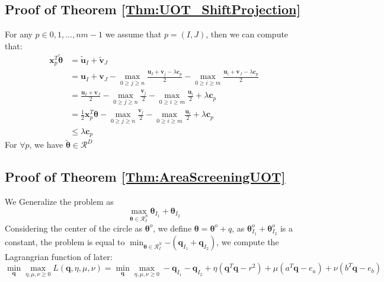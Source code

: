 \documentclass[twoside]{article}
\theoremstyle{plain}
\newcommand{\tranT}{T}
\renewcommand{\vec}[1]{\bm{#1}}
\begin{document}
\subsection{Proof of Theorem \ref{Thm:UOT_ShiftProjection}}
For any $p \in {0,1,...,nm -1}$ we assume that $p = (I,J)$, then we can compute that:
 \begin{equation}
\begin{split} 
\vec{x}_p^{\tranT}\tilde{\vec{\theta}} &= \tilde{\vec{u}}_{I} + \tilde{\vec{v}}_J \\
				    &= {\vec{u}}_{I} + {\vec{v}}_J - \max_{0\geq j\geq n} \frac{{\vec{u}}_I +{\vec{v}}_j - \lambda \vec{c}_{p}}{2} - \max_{0 \geq i \geq m} \frac{{\vec{u}}_i +{\vec{v}}_J - \lambda \vec{c}_{p}}{2}\\
				    &= \frac{{\vec{u}}_{I} + {\vec{v}}_J}{2} - \max_{0\geq j\geq n} \frac{{\vec{v}}_j}{2} - \max_{0 \geq i \geq m} \frac{{\vec{u}}_i }{2} + \lambda \vec{c}_{p}\\
				    &= \frac{1}{2}\vec{x}_p^{\tranT}{\vec{\theta}} - \max_{0\geq j\geq n} \frac{{\vec{v}}_j}{2} - \max_{0 \geq i \geq m} \frac{{\vec{u}}_i }{2} +\lambda \vec{c}_{p} \\
				    &\leq \lambda \vec{c}_{p} 
 \end{split} 
\end{equation}
For $\forall p$, we have $\tilde{\vec{\theta}} \in \mathcal{R}^{D}$

\subsection{Proof of Theorem \ref{Thm:AreaScreeningUOT}}
We Generalize the problem as 
\begin{equation}
\max_{\vec{\theta} \in \mathcal{R}^{S}_{I}}{ \vec{\theta}_{I_1} +\vec{\theta}_{I_2} }
\end{equation}
Considering the center of the circle as $\vec{\theta}^o$, we define $\vec{\theta} = \vec{\theta}^{o} + q$, as ${ \vec{\theta}^{o}_{I_1} +\vec{\theta}^{o}_{I_2} }$ is a constant, the problem is equal to $\min_{\vec{\theta} \in \mathcal{R}^{S}_{I}}{- ( \vec{q}_{I_1} +\vec{q}_{I_2} )}$, we compute the Lagrangrian function of later:
\begin{equation}
\min_{\vec{q}} \max_{\eta,\mu,\nu \geq 0} L(\vec{q},\eta,\mu,\nu) =\min_{\vec{q}}\max_{\eta,\mu,\nu\geq0} - {\vec{q}_{I_1} - \vec{q}_{I_2} + \eta( \vec{q}^{\tranT}\vec{q} - r^2)+\mu( a^{\tranT}\vec{q} - e_a ) + \nu( b^{\tranT}\vec{q} - e_b )}
\end{equation}
\end{document}
